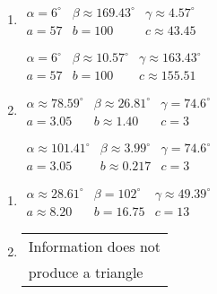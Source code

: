 \begin{multicols}{2} 

\begin{enumerate}

\setcounter{enumi}{\value{HW}}

\item $\begin{array}{lll}
\alpha = 6^{\circ} & \beta \approx 169.43^{\circ} & \gamma \approx 4.57^{\circ} \\
a = 57 & b = 100 & c \approx 43.45 \end{array}$

$\begin{array}{lll}
\alpha = 6^{\circ} & \beta \approx 10.57^{\circ} & \gamma \approx 163.43^{\circ} \\
a = 57 & b = 100 & c \approx 155.51 \end{array}$

\item $\begin{array}{lll}
\alpha \approx 78.59^{\circ} & \beta \approx 26.81^{\circ} & \gamma = 74.6^{\circ} \\
a = 3.05 & b \approx 1.40 & c = 3 \end{array}$

$\begin{array}{lll}
\alpha \approx 101.41^{\circ} & \beta \approx 3.99^{\circ} & \gamma = 74.6^{\circ} \\
a = 3.05 & b \approx 0.217 & c = 3 \end{array}$

\setcounter{HW}{\value{enumi}}

\end{enumerate}

\end{multicols}

\begin{multicols}{2} 

\begin{enumerate}

\setcounter{enumi}{\value{HW}}

\item $\begin{array}{lll}
\alpha \approx 28.61^{\circ} & \beta = 102^{\circ} & \gamma \approx 49.39^{\circ} \\
a \approx 8.20 & b = 16.75 & c = 13 \end{array}$

\item \begin{tabular}{l}
Information does not \\
produce a triangle \end{tabular}

\setcounter{HW}{\value{enumi}}

\end{enumerate}

\end{multicols}

